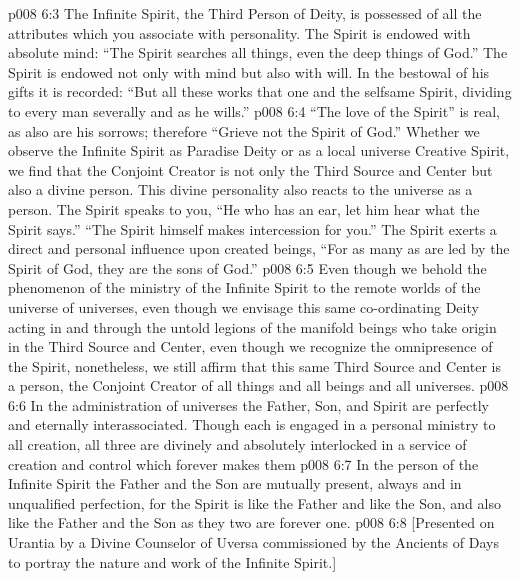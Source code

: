 \vs p008 6:3 The Infinite Spirit, the Third Person of Deity, is possessed of all the attributes which you associate with personality. The Spirit is endowed with absolute mind: “The Spirit searches all things, even the deep things of God.” The Spirit is endowed not only with mind but also with will. In the bestowal of his gifts it is recorded: “But all these works that one and the selfsame Spirit, dividing to every man severally and as he wills.”
\vs p008 6:4 “The love of the Spirit” is real, as also are his sorrows; therefore “Grieve not the Spirit of God.” Whether we observe the Infinite Spirit as Paradise Deity or as a local universe Creative Spirit, we find that the Conjoint Creator is not only the Third Source and Center but also a divine person. This divine personality also reacts to the universe as a person. The Spirit speaks to you, “He who has an ear, let him hear what the Spirit says.” “The Spirit himself makes intercession for you.” The Spirit exerts a direct and personal influence upon created beings, “For as many as are led by the Spirit of God, they are the sons of God.”
\vs p008 6:5 Even though we behold the phenomenon of the ministry of the Infinite Spirit to the remote worlds of the universe of universes, even though we envisage this same co\hyp{}ordinating Deity acting in and through the untold legions of the manifold beings who take origin in the Third Source and Center, even though we recognize the omnipresence of the Spirit, nonetheless, we still affirm that this same Third Source and Center is a person, the Conjoint Creator of all things and all beings and all universes.
\pc \vs p008 6:6 In the administration of universes the Father, Son, and Spirit are perfectly and eternally interassociated. Though each is engaged in a personal ministry to all creation, all three are divinely and absolutely interlocked in a service of creation and control which forever makes them 
\vs p008 6:7 In the person of the Infinite Spirit the Father and the Son are mutually present, always and in unqualified perfection, for the Spirit is like the Father and like the Son, and also like the Father and the Son as they two are forever one.
\vsetoff
\vs p008 6:8 [Presented on Urantia by a Divine Counselor of Uversa commissioned by the Ancients of Days to portray the nature and work of the Infinite Spirit.]
